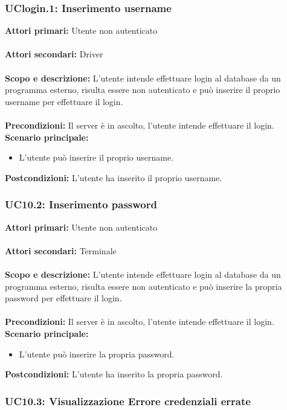 \documentclass{scalatekids-article}
\begin{document}
\subsubsection{UClogin.1: Inserimento username}

\textbf{Attori primari:} Utente non autenticato\\ \\
\textbf{Attori secondari:} Driver\\ \\
\textbf{Scopo e descrizione:}
L'utente intende effettuare login al database da un programma  esterno, risulta essere non autenticato e può inserire il proprio username per effettuare il login.\\ \\
\textbf{Precondizioni:} Il server è in ascolto, l'utente intende effettuare il login.
\textbf{Scenario principale:}
\begin{itemize}
\item L'utente può inserire il proprio username.
\end{itemize}
\textbf{Postcondizioni:} L'utente ha inserito il proprio username.

\subsubsection{UC10.2: Inserimento password}

\textbf{Attori primari:} Utente non autenticato\\ \\
\textbf{Attori secondari:} Terminale\\ \\
\textbf{Scopo e descrizione:}
L'utente intende effettuare login al database da un programma  esterno, risulta essere non autenticato e può inserire la propria password per effettuare il login.\\ \\
\textbf{Precondizioni:} Il server è in ascolto, l'utente intende effettuare il login.
\textbf{Scenario principale:}
\begin{itemize}
\item L'utente può inserire la propria password.
\end{itemize}
\textbf{Postcondizioni:} L'utente ha inserito la propria password.

\subsubsection{UC10.3: Visualizzazione Errore credenziali errate}
\end{document}
